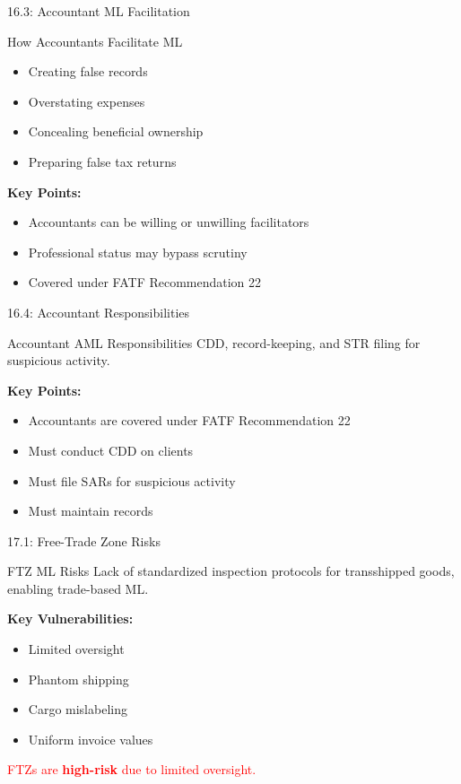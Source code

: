 \documentclass{beamer}
\begin{document}
	\begin{frame}{16.3: Accountant ML Facilitation}
		\begin{block}{How Accountants Facilitate ML}
			\begin{itemize}
				\item Creating false records
				\item Overstating expenses
				\item Concealing beneficial ownership
				\item Preparing false tax returns
			\end{itemize}
		\end{block}
		\textbf{Key Points:}
		\begin{itemize}
			\item Accountants can be willing or unwilling facilitators
			\item Professional status may bypass scrutiny
			\item Covered under FATF Recommendation 22
		\end{itemize}
	\end{frame}
	
	\begin{frame}{16.4: Accountant Responsibilities}
		\begin{block}{Accountant AML Responsibilities}
			CDD, record-keeping, and STR filing for suspicious activity.
		\end{block}
		\textbf{Key Points:}
		\begin{itemize}
			\item Accountants are covered under FATF Recommendation 22
			\item Must conduct CDD on clients
			\item Must file SARs for suspicious activity
			\item Must maintain records
		\end{itemize}
	\end{frame}
	
	
	\begin{frame}{17.1: Free-Trade Zone Risks}
		\begin{block}{FTZ ML Risks}
			Lack of standardized inspection protocols for transshipped goods, enabling trade-based ML.
		\end{block}
		\textbf{Key Vulnerabilities:}
		\begin{itemize}
			\item Limited oversight
			\item Phantom shipping
			\item Cargo mislabeling
			\item Uniform invoice values
		\end{itemize}
		\textcolor{red}{FTZs are \textbf{high-risk} due to limited oversight.}
	\end{frame}
	
\end{document}
